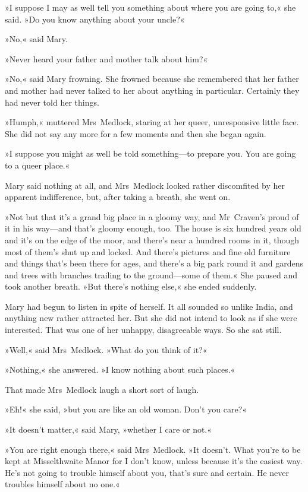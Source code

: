 »I suppose I may as well tell you something about where you are going to,« she said. »Do you know anything about your uncle?«

»No,« said Mary.

»Never heard your father and mother talk about him?«

»No,« said Mary frowning. She frowned because she remembered that her father and mother had never talked to her about anything in particular. Certainly they had never told her things.

»Humph,« muttered Mrs~Medlock, staring at her queer, unresponsive little face. She did not say any more for a few moments and then she began again.

»I suppose you might as well be told something—to prepare you. You are going to a queer place.«

Mary said nothing at all, and Mrs~Medlock looked rather discomfited by her apparent indifference, but, after taking a breath, she went on.

»Not but that it's a grand big place in a gloomy way, and Mr~Craven's proud of it in his way—and that's gloomy enough, too. The house is six hundred years old and it's on the edge of the moor, and there's near a hundred rooms in it, though most of them's shut up and locked. And there's pictures and fine old furniture and things that's been there for ages, and there's a big park round it and gardens and trees with branches trailing to the ground—some of them.« She paused and took another breath. »But there's nothing else,« she ended suddenly.

Mary had begun to listen in spite of herself. It all sounded so unlike India, and anything new rather attracted her. But she did not intend to look as if she were interested. That was one of her unhappy, disagreeable ways. So she sat still.

»Well,« said Mrs~Medlock. »What do you think of it?«

»Nothing,« she answered. »I know nothing about such places.«

That made Mrs~Medlock laugh a short sort of laugh.

»Eh!« she said, »but you are like an old woman. Don't you care?«

»It doesn't matter,« said Mary, »whether I care or not.«

»You are right enough there,« said Mrs~Medlock. »It doesn't. What you're to be kept at Misselthwaite Manor for I don't know, unless because it's the easiest way. He's not going to trouble himself about you, that's sure and certain. He never troubles himself about no one.«

